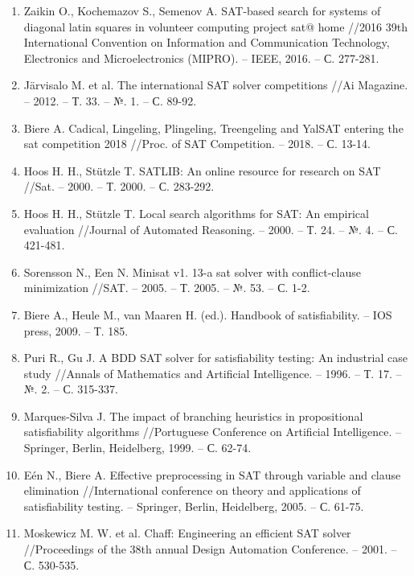 \begin{enumerate}[leftmargin=0.5cm,topsep=0pt,itemsep=-1ex,partopsep=1ex,parsep=1ex,label=\arabic{*}.]
\item
Zaikin O., Kochemazov S., Semenov A. SAT-based search for systems of diagonal latin squares in volunteer computing project sat@ home //2016 39th International Convention on Information and Communication Technology, Electronics and Microelectronics (MIPRO). – IEEE, 2016. – С. 277-281.

\item
Järvisalo M. et al. The international SAT solver competitions //Ai Magazine. – 2012. – Т. 33. – №. 1. – С. 89-92.
	
\item
Biere A. Cadical, Lingeling, Plingeling, Treengeling and YalSAT entering the sat competition 2018 //Proc. of SAT Competition. – 2018. – С. 13-14.

\item
Hoos H. H., Stützle T. SATLIB: An online resource for research on SAT //Sat. – 2000. – Т. 2000. – С. 283-292.

\item
Hoos H. H., Stützle T. Local search algorithms for SAT: An empirical evaluation //Journal of Automated Reasoning. – 2000. – Т. 24. – №. 4. – С. 421-481.

\item
Sorensson N., Een N. Minisat v1. 13-a sat solver with conflict-clause minimization //SAT. – 2005. – Т. 2005. – №. 53. – С. 1-2.

\item
Biere A., Heule M., van Maaren H. (ed.). Handbook of satisfiability. – IOS press, 2009. – Т. 185.

\item
Puri R., Gu J. A BDD SAT solver for satisfiability testing: An industrial case study //Annals of Mathematics and Artificial Intelligence. – 1996. – Т. 17. – №. 2. – С. 315-337.

\item
Marques-Silva J. The impact of branching heuristics in propositional satisfiability algorithms //Portuguese Conference on Artificial Intelligence. – Springer, Berlin, Heidelberg, 1999. – С. 62-74.

\item
Eén N., Biere A. Effective preprocessing in SAT through variable and clause elimination //International conference on theory and applications of satisfiability testing. – Springer, Berlin, Heidelberg, 2005. – С. 61-75.

\item
Moskewicz M. W. et al. Chaff: Engineering an efficient SAT solver //Proceedings of the 38th annual Design Automation Conference. – 2001. – С. 530-535.


\end{enumerate}
